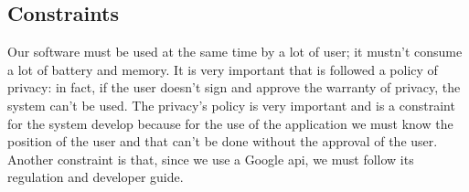 
\subsection{Constraints} \label{subsec:constraints}
Our software must be used at the same time by a lot of user; it mustn't consume a lot of battery and memory. It is very important that is followed a policy of privacy: in fact, if the user doesn't sign and approve the warranty of privacy, the system can't be used. The privacy's policy is very important and is a constraint for the system develop because for the use of the application we must know the position of the user and that can't be done without the approval of the user. Another constraint is that, since we use a Google \acs{api}, we must follow its regulation and developer guide.


